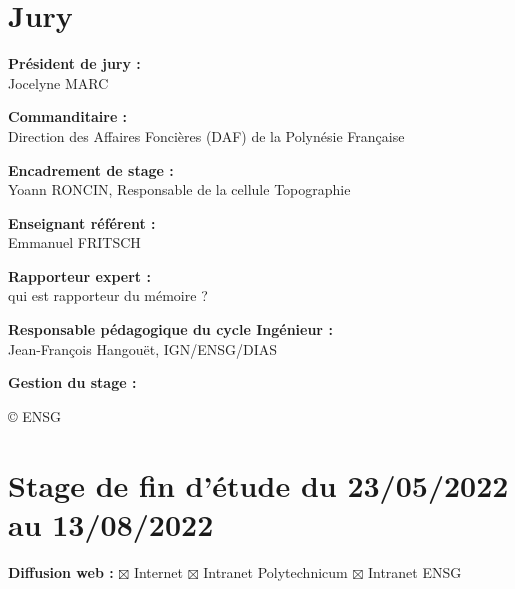 \thispagestyle{plain}
\section*{Jury}
\vspace{0.5cm}

\textbf{Président de jury :} \\

Jocelyne MARC

\vspace{0.5cm}

\textbf{Commanditaire :} \\

Direction des Affaires Foncières (DAF) de la Polynésie Française

\vspace{0.5cm}

\textbf{Encadrement de stage :} \\ 

Yoann RONCIN, Responsable de la cellule Topographie

\vspace{0.5cm}

\textbf{Enseignant référent :} \\ 

Emmanuel FRITSCH

\vspace{0.5cm}

\textbf{Rapporteur expert :} \\ 

qui est rapporteur du mémoire ?

\vspace{0.5cm}

\textbf{Responsable pédagogique du {\color{red} cycle Ingénieur} :} \\

Jean-François Hangouët, IGN/ENSG/DIAS

\vspace{0.5cm}

\textbf{Gestion du stage :} \\ 



\vspace{0.5cm}


\copyright \hspace{0.3cm} ENSG

\section*{Stage de fin d'étude du 23/05/2022 au 13/08/2022}
\vspace{0.3cm}
\textbf{Diffusion web :} $\boxtimes$ Internet \hspace{0.2cm}$\boxtimes$ Intranet Polytechnicum\hspace{0.2cm}
$\boxtimes$ Intranet ENSG\vspace{0.3cm}

